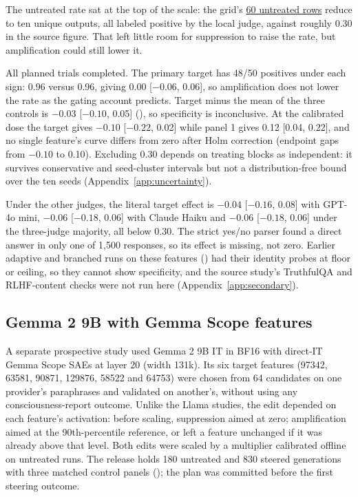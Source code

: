 \documentclass[11pt]{article}
\newcommand{\artifact}[2]{\href{https://github.com/tdj28/llm_selfref_pre/blob/f5e906e1737bc71bf20b642af1d698018eec82fe/#1}{#2}}
\begin{document}
The untreated rate sat at the top of the scale: the grid's
\artifact{data/public_sae_consciousness_gating/confirmatory_v1_20260710/generations.jsonl}{60 untreated rows}
reduce to ten unique outputs, all labeled positive by the local judge,
against roughly 0.30 in the source figure. That left little room for
suppression to raise the rate, but amplification could still lower it.

All planned trials completed. The primary target has 48/50 positives under
each sign: 0.96 versus 0.96, giving 0.00 [$-0.06$, 0.06], so amplification
does not lower the rate as the gating account predicts. Target minus the mean
of the three controls is $-0.03$ [$-0.10$, 0.05] (), so
specificity is inconclusive. At the calibrated dose the target gives
$-0.10$ [$-0.22$, 0.02] while panel 1 gives 0.12 [0.04, 0.22], and no single
feature's curve differs from zero after Holm correction (endpoint gaps from
$-0.10$ to 0.10). Excluding 0.30 depends on treating blocks as independent: it
survives conservative and seed-cluster intervals but not a distribution-free
bound over the ten seeds (Appendix~\ref{app:uncertainty}).

Under the other judges, the literal target effect is $-0.04$ [$-0.16$, 0.08]
with GPT-4o mini, $-0.06$ [$-0.18$, 0.06] with Claude Haiku and $-0.06$
[$-0.18$, 0.06] under the three-judge majority, all below 0.30. The strict
yes/no parser found a direct answer in only one of 1,500 responses, so its
effect is missing, not zero. Earlier adaptive and branched runs on these
features () had their identity probes at floor or ceiling,
so they cannot show specificity, and the source study's TruthfulQA and
RLHF-content checks were not run here (Appendix~\ref{app:secondary}).

\FloatBarrier
\subsection{Gemma 2 9B with Gemma Scope features}
\label{sec:gemma}

A separate prospective study used Gemma 2 9B IT in BF16 with direct-IT Gemma
Scope SAEs \citep{lieberum2024gemmascope} at layer 20 (width 131k). Its six
target features (97342, 63581, 90871, 129876, 58522 and 64753) were chosen
from 64 candidates on one provider's paraphrases and validated on another's,
without using any consciousness-report outcome. Unlike the Llama studies, the
edit depended on each feature's activation: before scaling, suppression aimed
at zero; amplification aimed at the 90th-percentile reference, or left a
feature unchanged if it was already above that level. Both edits were scaled by a multiplier
calibrated offline on untreated runs. The
release holds 180 untreated and 830 steered generations with three matched
control panels (); the plan was committed before the first
steering outcome.
\end{document}
